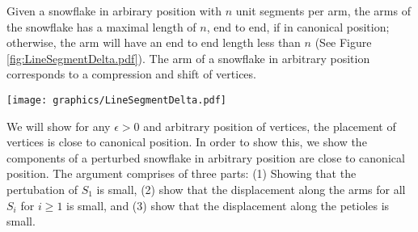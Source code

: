 Given a snowflake in arbirary position with $n$ unit segments per arm, the arms of the snowflake has a maximal length of $n$, end to end, if in canonical position; otherwise, the arm will have an end to end length less than $n$ (See Figure \ref{fig:LineSegmentDelta.pdf}).  
The arm of a snowflake in arbitrary position corresponds to a compression and shift of vertices.  


\begin{minipage}{\linewidth}
\begin{center}
\texttt{[image: graphics/LineSegmentDelta.pdf]}
\label{fig:LineSegmentDelta.pdf}
\end{center}
\end{minipage}

We will show for any $\epsilon >0$ and arbitrary position of vertices, the placement of vertices is close to canonical position.  
In order to show this, we show the components of a perturbed snowflake in arbitrary position  are close to canonical position.  
The argument comprises of three parts: (1) Showing that the pertubation of $S_1$ is small, (2) show that the displacement along the arms for all $S_i$ for $i \geq 1$ is small, and (3) show that the displacement along the petioles is small.  

